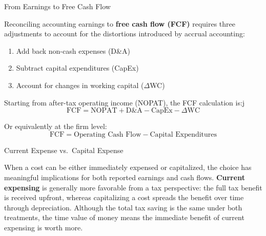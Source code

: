 \documentclass[10pt]{article}
\begin{document}
    \begin{core}[label=core:fcf]{From Earnings to Free Cash Flow}

      Reconciling accounting earnings to \textbf{free cash flow (FCF)} requires three adjustments to account for the distortions introduced by accrual accounting:

      \begin{enumerate}

        \item Add back non-cash expenses (D\&A)

        \item Subtract capital expenditures (CapEx)

        \item Account for changes in working capital ($\Delta$WC)

      \end{enumerate}

      Starting from after-tax operating income (NOPAT), the FCF calculation is:j
      \[
        \text{FCF} = \text{NOPAT} + \text{D\&A} - \text{CapEx} - \Delta\text{WC}
      \]

      Or equivalently at the firm level:
      \[
        \text{FCF} = \text{Operating Cash Flow} - \text{Capital Expenditures}
      \]




    \end{core}

    \begin{core}{Current Expense vs.\ Capital Expense}
      
      When a cost can be either immediately expensed or capitalized, the choice has meaningful implications for both reported earnings and cash flows. \textbf{Current expensing} is generally more favorable from a tax perspective: the full tax benefit is received upfront, whereas capitalizing a cost spreads the benefit over time through depreciation. Although the total tax saving is the same under both treatments, the time value of money means the immediate benefit of current expensing is worth more.


    \end{core}
\end{document}
